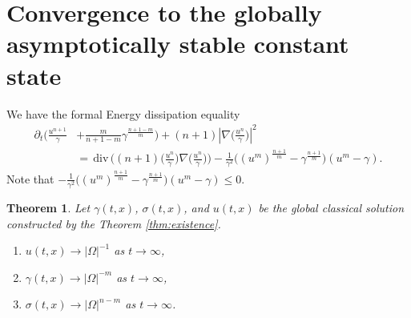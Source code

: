 \documentclass[a4paper,11pt]{article}
\def\div{\,\textrm{div}\,}
\newtheorem{theorem}{Theorem}
\theoremstyle{remark}
\begin{document}
% 






\section{Convergence to the globally asymptotically stable constant state}
We have the formal Energy dissipation equality
\begin{align}
 \partial_t\Big( \frac{u^{n+1}}{\gamma} &+ \frac{m}{n+1-m}\gamma^{\frac{n+1-m}{m}}\Big) + (n+1) \left|\nabla \big(\frac{u^n}{\gamma}\big)\right|^2 \nonumber \\
 &= \div \Big( (n+1)\big(\frac{u^n}{\gamma}\big)\nabla \big(\frac{u^n}{\gamma}\big)\Big) - \frac{1}{\gamma^2}\Big( (u^m)^{\frac{n+1}{m}} - \gamma^{\frac{n+1}{m}}\Big)(u^m-\gamma). \label{eq:energy}
\end{align}
Note that $\displaystyle - \frac{1}{\gamma^2}\Big( (u^m)^{\frac{n+1}{m}} - \gamma^{\frac{n+1}{m}}\Big)(u^m-\gamma)\le0$.
\begin{theorem} Let $\gamma(t,x)$, $\sigma(t,x)$, and $u(t,x)$ be the global classical solution constructed by the Theorem \ref{thm:existence}.
 \begin{enumerate}
  \item $u(t,x) \rightarrow |\Omega|^{-1}$ as $t \rightarrow \infty$, %
  \item $\gamma(t,x) \rightarrow |\Omega|^{-m}$ as $t \rightarrow \infty$,
  \item $\sigma(t,x) \rightarrow |\Omega|^{n-m}$ as $t \rightarrow \infty$.
 \end{enumerate}
\end{theorem}
\end{document}
